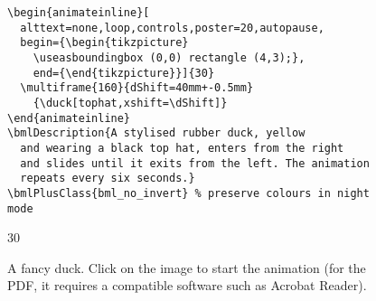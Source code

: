 \documentclass[a4paper,british]{article}
\begin{document}
\begin{figure}
  \begin{lstlisting}[style=bookml]
\begin{animateinline}[
  alttext=none,loop,controls,poster=20,autopause,
  begin={\begin{tikzpicture}
    \useasboundingbox (0,0) rectangle (4,3);},
    end={\end{tikzpicture}}]{30}
  \multiframe{160}{dShift=40mm+-0.5mm}
    {\duck[tophat,xshift=\dShift]}
\end{animateinline}
\bmlDescription{A stylised rubber duck, yellow
  and wearing a black top hat, enters from the right
  and slides until it exits from the left. The animation
  repeats every six seconds.}
\bmlPlusClass{bml_no_invert} % preserve colours in night mode
  \end{lstlisting}
  \begin{center}
    \begin{animateinline}[
      alttext=none,loop,controls,poster=20,autopause,
      poster=20,autopause,
      begin={\begin{tikzpicture}%
        \useasboundingbox (0,0) rectangle (4,3);},
        end={\end{tikzpicture}}]{30}
        {\duck[tophat,xshift=\dShift]}
    \end{animateinline}
  \end{center}
  \caption{A fancy duck. Click on the image to start the animation (for the PDF, it requires a compatible software such as Acrobat Reader).}
  \label{fig:duck}
\end{figure}
\end{document}
